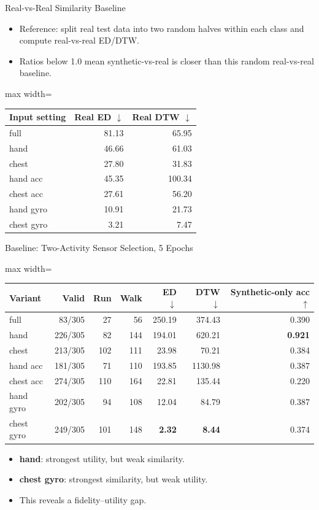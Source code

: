 \documentclass[aspectratio=169,11pt]{ctexbeamer}
\newcommand{\up}{\(\uparrow\)}
\newcommand{\down}{\(\downarrow\)}
\newcommand{\best}[1]{\textcolor{goodgreen}{\textbf{#1}}}
\begin{document}
\begin{frame}{Real-vs-Real Similarity Baseline}
\small
\begin{itemize}
  \item Reference: split real test data into two random halves within each class and compute real-vs-real ED/DTW.
  \item Ratios below 1.0 mean synthetic-vs-real is closer than this random real-vs-real baseline.
\end{itemize}
\begin{adjustbox}{max width=\textwidth}
\begin{tabular}{lrr}
\toprule
Input setting & Real ED \down & Real DTW \down \\
\midrule
full & 81.13 & 65.95 \\
hand & 46.66 & 61.03 \\
chest & 27.80 & 31.83 \\
hand acc & 45.35 & 100.34 \\
chest acc & 27.61 & 56.20 \\
hand gyro & 10.91 & 21.73 \\
chest gyro & 3.21 & 7.47 \\
\bottomrule
\end{tabular}
\end{adjustbox}
\end{frame}

\begin{frame}{Baseline: Two-Activity Sensor Selection, 5 Epochs}
\small
\begin{adjustbox}{max width=\textwidth}
\begin{tabular}{lrrrrrr}
\toprule
Variant & Valid & Run & Walk & ED \down & DTW \down & Synthetic-only acc \up \\
\midrule
full & 83/305 & 27 & 56 & 250.19 & 374.43 & 0.390 \\
hand & 226/305 & 82 & 144 & 194.01 & 620.21 & \best{0.921} \\
chest & 213/305 & 102 & 111 & 23.98 & 70.21 & 0.384 \\
hand acc & 181/305 & 71 & 110 & 193.85 & 1130.98 & 0.387 \\
chest acc & 274/305 & 110 & 164 & 22.81 & 135.44 & 0.220 \\
hand gyro & 202/305 & 94 & 108 & 12.04 & 84.79 & 0.387 \\
chest gyro & 249/305 & 101 & 148 & \best{2.32} & \best{8.44} & 0.374 \\
\bottomrule
\end{tabular}
\end{adjustbox}
\vspace{0.5em}
\begin{itemize}
  \item \textbf{hand}: strongest utility, but weak similarity.
  \item \textbf{chest gyro}: strongest similarity, but weak utility.
  \item This reveals a fidelity--utility gap.
\end{itemize}
\end{frame}
\end{document}
